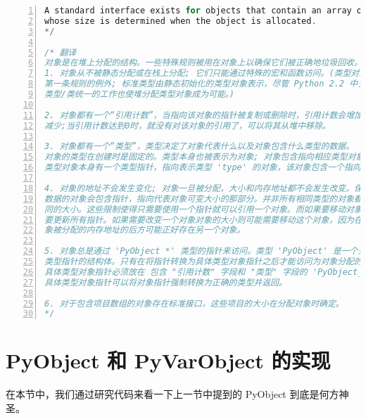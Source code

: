 \begin{lstlisting}[language=C, numbers=left, numbersep=1em, numberstyle=\footnotesize , breaklines=true]
A standard interface exists for objects that contain an array of items
whose size is determined when the object is allocated.
*/

/* 翻译
对象是在堆上分配的结构。一些特殊规则被用在对象上以确保它们被正确地垃圾回收。
1. 对象从不被静态分配或在栈上分配; 它们只能通过特殊的宏和函数访问。(类型对象是
第一条规则的例外; 标准类型由静态初始化的类型对象表示，尽管 Python 2.2 中关于
类型/类统一的工作也使堆分配类型对象成为可能。)

2. 对象都有一个“引用计数”，当指向该对象的指针被复制或删除时，引用计数会增加或
减少;当引用计数达到0时，就没有对该对象的引用了，可以将其从堆中移除。

3. 对象都有一个“类型”，类型决定了对象代表什么以及对象包含什么类型的数据。
对象的类型在创建时是固定的。类型本身也被表示为对象; 对象包含指向相应类型对象的指针。
类型对象本身有一个类型指针，指向表示类型 'type' 的对象，该对象包含一个指向自身的指针!

4. 对象的地址不会发生变化; 对象一旦被分配，大小和内存地址都不会发生改变。保存可变大小
数据的对象会包含指针，指向代表对象可变大小的那部分。并非所有相同类型的对象都具有相
同的大小。这些限制使得只需要使用一个指针就可以引用一个对象。而如果要移动对象，则需
要更新所有指针。如果需要改变一个对象对象的大小则可能需要移动这个对象，因为在这个对
象被分配的内存地址的后方可能正好存在另一个对象。

5. 对象总是通过 'PyObject *' 类型的指针来访问。类型 'PyObject' 是一个只包含引用计数和
类型指针的结构体。只有在将指针转换为具体类型对象指针之后才能访问为对象分配的其他数据。
具体类型对象指针必须放在 包含 "引用计数" 字段和 "类型" 字段的 'PyObject_HEAD' 字段后面。
具体类型对象指针可以将对象指针强制转换为正确的类型并返回。

6. 对于包含项目数组的对象存在标准接口，这些项目的大小在分配对象时确定。
*/
\end{lstlisting}

\section{PyObject 和 PyVarObject 的实现}
在本节中，我们通过研究代码来看一下上一节中提到的 PyObject 到底是何方神圣。

